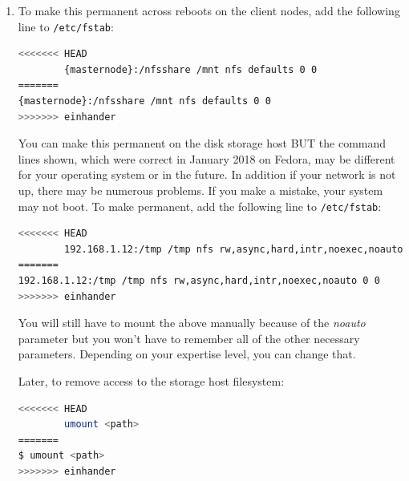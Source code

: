 \begin{description}
\begin{enumerate}
        \item To make this permanent across reboots on the client nodes, add the following line to \texttt{/etc/fstab}: 
        \begin{lstlisting}[language=bash]
<<<<<<< HEAD
        {masternode}:/nfsshare /mnt nfs defaults 0 0
=======
{masternode}:/nfsshare /mnt nfs defaults 0 0
>>>>>>> einhander
        \end{lstlisting}
        You can make this permanent on the disk storage host BUT the command lines shown, which were
        correct in January 2018 on Fedora, may be different for your operating system or in the future.  In
        addition if your network is not up, there may be numerous problems.  If you make a mistake, your
        system may not boot.  To make permanent, add the following line to \texttt{/etc/fstab}:
        \begin{lstlisting}[language=bash]
<<<<<<< HEAD
        192.168.1.12:/tmp /tmp nfs rw,async,hard,intr,noexec,noauto 0 0
=======
192.168.1.12:/tmp /tmp nfs rw,async,hard,intr,noexec,noauto 0 0
>>>>>>> einhander
        \end{lstlisting}
        You will still have to mount the above manually because of the \textit{noauto} parameter but you won’t
        have to remember all of the other necessary parameters.  Depending on your expertise level, you can
        change that.
        
        Later, to remove access to the storage host filesystem:        
        \begin{lstlisting}[language=bash]
<<<<<<< HEAD
        umount <path>
=======
$ umount <path>
>>>>>>> einhander
        \end{lstlisting}
        

\end{enumerate}
\end{description}
